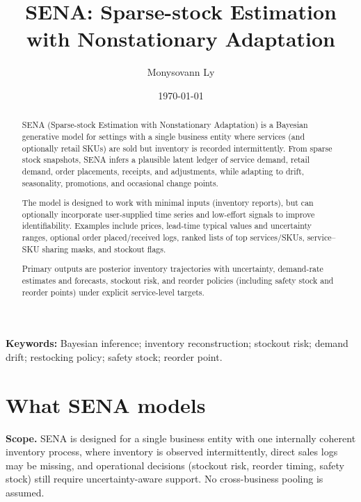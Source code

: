 \documentclass[11pt]{article}
\title{SENA: Sparse-stock Estimation with Nonstationary Adaptation}
\author{Monysovann Ly}
\date{\today}
\begin{document}
\begin{titlepage}
\maketitle

\begin{abstract}
SENA (Sparse-stock Estimation with Nonstationary Adaptation) is a Bayesian generative model for settings with a single business entity where services (and optionally retail SKUs) are sold but inventory is recorded intermittently. From sparse stock snapshots, SENA infers a plausible latent ledger of service demand, retail demand, order placements, receipts, and adjustments, while adapting to drift, seasonality, promotions, and occasional change points.

The model is designed to work with minimal inputs (inventory reports), but can optionally incorporate user-supplied time series and low-effort signals to improve identifiability.
Examples include prices, lead-time typical values and uncertainty ranges, optional order placed/received logs, ranked lists of top services/SKUs, service--SKU sharing masks, and stockout flags.

Primary outputs are posterior inventory trajectories with uncertainty, demand-rate estimates and forecasts, stockout risk, and reorder policies (including safety stock and reorder points) under explicit service-level targets.
\end{abstract}

\vspace{1em}
\noindent\textbf{Keywords:} Bayesian inference; inventory reconstruction; stockout risk; demand drift; restocking policy; safety stock; reorder point.

\end{titlepage}

\tableofcontents
\newpage

\section{What SENA models}

\textbf{Scope.} SENA is designed for a single business entity with one internally coherent inventory process, where inventory is observed intermittently, direct sales logs may be missing, and operational decisions (stockout risk, reorder timing, safety stock) still require uncertainty-aware support.
No cross-business pooling is assumed.
\end{document}
